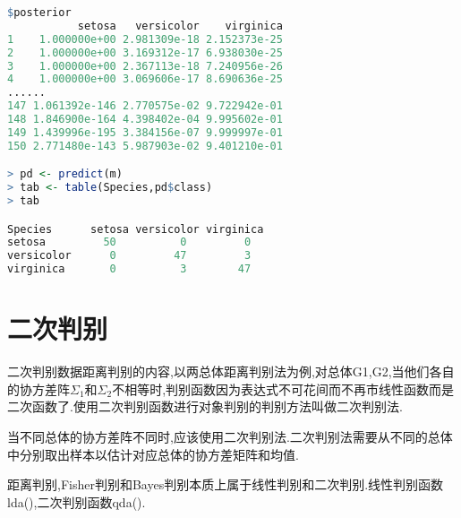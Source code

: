\documentclass[11pt,a4paper,oneside]{book}
\begin{document}
\begin{lstlisting}[language=r]
$posterior
           setosa   versicolor    virginica
1    1.000000e+00 2.981309e-18 2.152373e-25
2    1.000000e+00 3.169312e-17 6.938030e-25
3    1.000000e+00 2.367113e-18 7.240956e-26
4    1.000000e+00 3.069606e-17 8.690636e-25
......
147 1.061392e-146 2.770575e-02 9.722942e-01
148 1.846900e-164 4.398402e-04 9.995602e-01
149 1.439996e-195 3.384156e-07 9.999997e-01
150 2.771480e-143 5.987903e-02 9.401210e-01

> pd <- predict(m)
> tab <- table(Species,pd$class)
> tab

Species      setosa versicolor virginica
setosa         50          0         0
versicolor      0         47         3
virginica       0          3        47
\end{lstlisting}

\section{二次判别}
二次判别数据距离判别的内容,以两总体距离判别法为例,对总体G1,G2,当他们各自的协方差阵$ \Sigma_1 $和$ \Sigma_2 $不相等时,判别函数因为表达式不可花间而不再市线性函数而是二次函数了.使用二次判别函数进行对象判别的判别方法叫做二次判别法.

当不同总体的协方差阵不同时,应该使用二次判别法.二次判别法需要从不同的总体中分别取出样本以估计对应总体的协方差矩阵和均值.

距离判别,Fisher判别和Bayes判别本质上属于线性判别和二次判别.线性判别函数lda(),二次判别函数qda().
\end{document}
